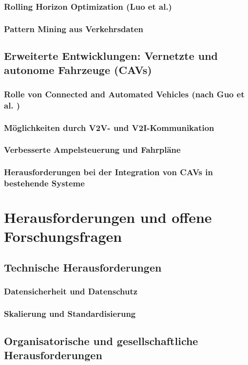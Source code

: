 \documentclass[ngerman]{seminarbeitrag} %
\begin{document}
\subsubsection{Rolling Horizon Optimization (Luo et al.)}
\subsubsection{Pattern Mining aus Verkehrsdaten}
\subsection{Erweiterte Entwicklungen: Vernetzte und autonome Fahrzeuge (CAVs)}
\subsubsection{Rolle von Connected and Automated Vehicles (nach Guo et al. )}
\subsubsection{Möglichkeiten durch V2V- und V2I-Kommunikation}
\subsubsection{Verbesserte Ampelsteuerung und Fahrpläne}
\subsubsection{Herausforderungen bei der Integration von CAVs in bestehende Systeme}

\pagebreak
\section{Herausforderungen und offene Forschungsfragen}

\subsection{Technische Herausforderungen}
\subsubsection{Datensicherheit und Datenschutz}
\subsubsection{Skalierung und Standardisierung}
\subsection{Organisatorische und gesellschaftliche Herausforderungen}
\end{document}
